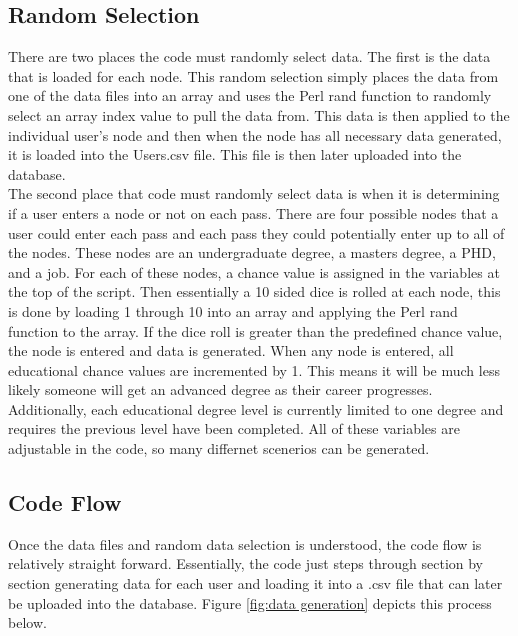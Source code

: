 \subsection{Random Selection}
There are two places the code must randomly select data.  The first is the
data that is loaded for each node.  This random selection simply places the data
from one of the data files into an array and uses the Perl rand function to
randomly select an array index value to pull the data from.  This data is then
applied to the individual user's node and then when the node has all necessary
data generated, it is loaded into the Users.csv file.  This file is then later
uploaded into the database.
\\
The second place that code must randomly select data is when it is determining
if a user enters a node or not on each pass.  There are four possible nodes that
a user could enter each pass and each pass they could potentially enter up to
all of the nodes.  These nodes are an undergraduate degree, a masters degree, a
PHD, and a job.  For each of these nodes, a chance value is assigned in the
variables at the top of the script.  Then essentially a 10 sided dice is rolled
at each node, this is done by loading 1 through 10 into an array and applying
the Perl rand function to the array.  If the dice roll is greater than the
predefined chance value, the node is entered and data is generated.  When any
node is entered, all educational chance values are incremented by 1.  This means
it will be much less likely someone will get an advanced degree as their career
progresses.  Additionally, each educational degree level is currently limited to
one degree and requires the previous level have been completed.  All of these
variables are adjustable in the code, so many differnet scenerios can be
generated.


\subsection{Code Flow}
Once the data files and random data selection is understood, the code flow is
relatively straight forward.  Essentially, the code just steps through section
by section generating data for each user and loading it into a .csv file that
can later be uploaded into the database.  Figure \ref {fig:data generation}
depicts this process below.

\pagebreak
\usetikzlibrary{shapes,arrows,chains}

